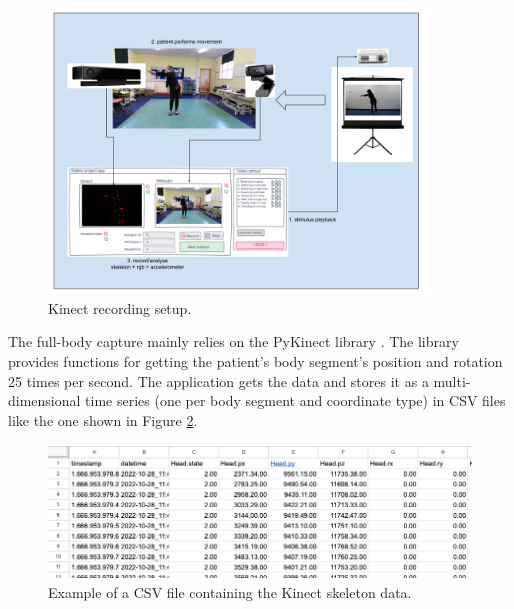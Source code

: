                     \begin{figure}[H]
                        \centering
                        \includegraphics[width=0.9\textwidth]{./resources/kinect/setup.png}
                        \caption{Kinect recording setup.}
                        \label{fig:kinect_setup}
                    \end{figure}
                    

                    The full-body capture mainly relies on the PyKinect library \cite{GitHubKinectPyKinect2}.
                    The library provides functions for getting the patient's body segment's position and rotation 25 times per second. The application gets the data and stores it as a multi-dimensional time series (one per body segment and coordinate type) in CSV files like the one shown in Figure \ref{fig:csv_structure}.
                    \newpage
                    \begin{figure}[H]
                        \centering
                        \includegraphics[width=1.0\textwidth]{./resources/other/data.png}
                        \caption{Example of a CSV file containing the Kinect skeleton data.}
                        \label{fig:csv_structure}
                    \end{figure}

